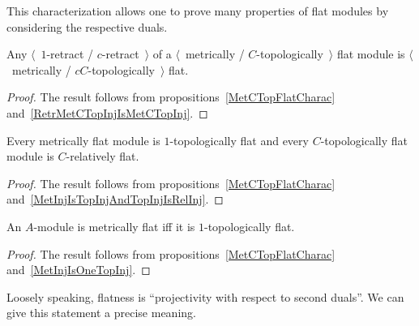 This characterization allows one to prove many properties of flat modules by 
considering the respective duals.

\begin{proposition}\label{RetrMetCTopFlatIsMetCTopFlat} 
Any $\langle$~$1$-retract / $c$-retract~$\rangle$ of a
$\langle$~metrically / $C$-topologically~$\rangle$ flat module is 
$\langle$~metrically / $cC$-topologically~$\rangle$ flat.
\end{proposition}
\begin{proof} The result follows from propositions~\ref{MetCTopFlatCharac} 
and~\ref{RetrMetCTopInjIsMetCTopInj}.
\end{proof}

\begin{proposition}\label{MetFlatIsTopFlatAndTopFlatIsRelFlat} Every metrically
flat module is $1$-topologically flat and every $C$-topologically flat module is
$C$-relatively flat.
\end{proposition}
\begin{proof} The result follows from propositions~\ref{MetCTopFlatCharac} 
and~\ref{MetInjIsTopInjAndTopInjIsRelInj}.
\end{proof}

\begin{proposition}\label{MetFlatIsOneTopFlat} An $A$-module is metrically flat
iff it is $1$-topologically flat.
\end{proposition}
\begin{proof} The result follows from propositions~\ref{MetCTopFlatCharac}
and~\ref{MetInjIsOneTopInj}.
\end{proof}

Loosely speaking, flatness is ``projectivity with respect to second duals''. 
We can give this statement a precise meaning.

